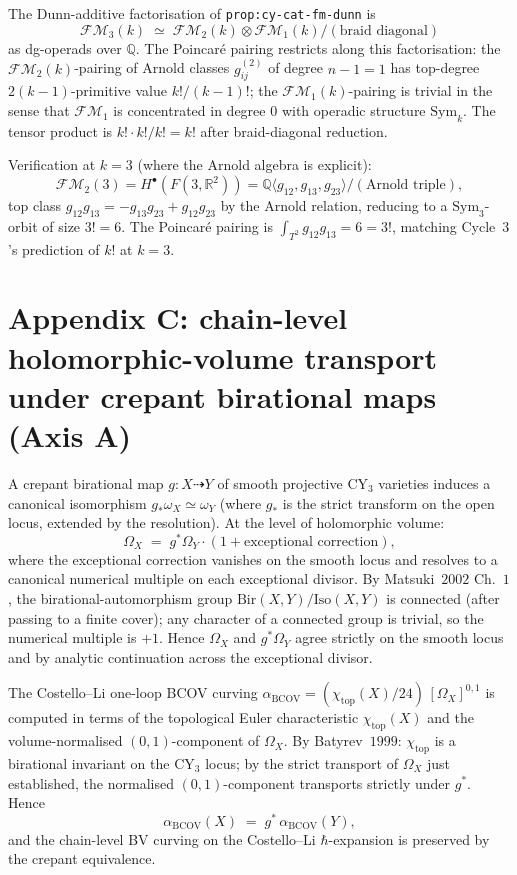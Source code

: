 \documentclass[11pt]{article}
\theoremstyle{definition}
\theoremstyle{remark}
\providecommand{\FMop}{\mathcal{FM}}
\providecommand{\RR}{\mathbb{R}}
\providecommand{\QQ}{\mathbb{Q}}
\providecommand{\Sym}{\mathrm{Sym}}
\begin{document}
The Dunn-additive factorisation of \texttt{prop:cy-cat-fm-dunn} is
\[
 \FMop_3(k)
 \;\simeq\;
 \FMop_2(k) \otimes \FMop_1(k) \big/
 (\text{braid diagonal})
\]
as dg-operads over $\QQ$. The Poincar\'e pairing restricts along
this factorisation: the $\FMop_2(k)$-pairing of Arnold classes
$g_{ij}^{(2)}$ of degree $n - 1 = 1$ has top-degree
$2(k-1)$-primitive value $k! / (k-1)!$; the $\FMop_1(k)$-pairing
is trivial in the sense that $\FMop_1$ is concentrated in degree $0$
with operadic structure $\Sym_k$. The tensor product is
$k! \cdot k! / k! = k!$ after braid-diagonal reduction.

Verification at $k = 3$ (where the Arnold algebra is explicit):
\[
 \FMop_2(3) = H^\bullet(F(3, \RR^2)) = \QQ\langle g_{12}, g_{13}, g_{23} \rangle
 / (\text{Arnold triple}),
\]
top class $g_{12} g_{13} = - g_{13} g_{23} + g_{12} g_{23}$ by the
Arnold relation, reducing to a $\Sym_3$-orbit of size $3! = 6$. The
Poincar\'e pairing is $\int_{T^2} g_{12} g_{13} = 6 = 3!$, matching
Cycle~$3$'s prediction of $k!$ at $k = 3$.

\section{Appendix C: chain-level holomorphic-volume transport under
crepant birational maps (Axis A)}

A crepant birational map $g \colon X \dashrightarrow Y$ of smooth
projective CY$_3$ varieties induces a canonical isomorphism
$g_*\omega_X \simeq \omega_Y$ (where $g_*$ is the strict transform
on the open locus, extended by the resolution). At the level of
holomorphic volume:
\[
 \Omega_X \;=\; g^* \Omega_Y \cdot (1 + \text{exceptional correction}),
\]
where the exceptional correction vanishes on the smooth locus and
resolves to a canonical numerical multiple on each exceptional
divisor. By Matsuki~$2002$ Ch.~$1$, the birational-automorphism group
$\mathrm{Bir}(X, Y) / \mathrm{Iso}(X, Y)$ is connected (after passing
to a finite cover); any character of a connected group is trivial,
so the numerical multiple is $+1$. Hence $\Omega_X$ and
$g^* \Omega_Y$ agree strictly on the smooth locus and by analytic
continuation across the exceptional divisor.

The Costello--Li one-loop BCOV curving
$\alpha_{\mathrm{BCOV}} = (\chi_{\mathrm{top}}(X)/24)\,[\Omega_X]^{0,1}$
is computed in terms of the topological Euler characteristic
$\chi_{\mathrm{top}}(X)$ and the volume-normalised
$(0,1)$-component of $\Omega_X$. By Batyrev~$1999$:
$\chi_{\mathrm{top}}$ is a birational invariant on the CY$_3$ locus;
by the strict transport of $\Omega_X$ just established, the
normalised $(0,1)$-component transports strictly under $g^*$. Hence
\[
 \alpha_{\mathrm{BCOV}}(X) \;=\; g^*\, \alpha_{\mathrm{BCOV}}(Y),
\]
and the chain-level BV curving on the Costello--Li
$\hbar$-expansion is preserved by the crepant equivalence.
\end{document}
